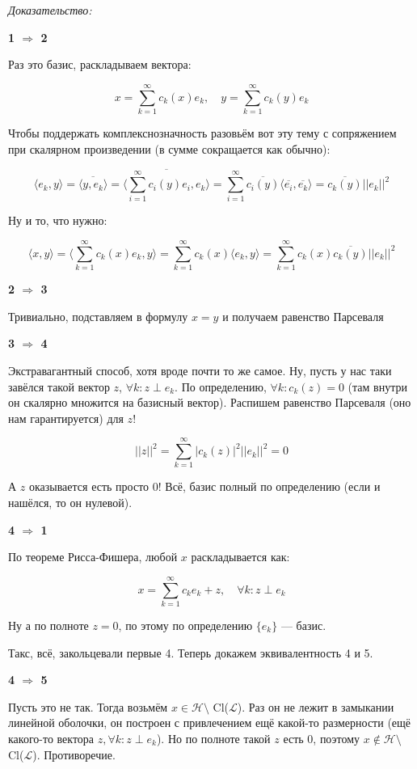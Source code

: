 \documentclass{article}
\def\sk#1#2{\langle #1, #2 \rangle}
\begin{document}
\textit{Доказательство:}

\textbf{1 $\Rightarrow$ 2}

Раз это базис, раскладываем вектора:

\[x = \sum_{k = 1}^{\infty} c_k(x)e_k, \quad y = \sum_{k = 1}^{\infty} c_k(y)e_k\]

Чтобы поддержать комплекснозначность разовьём вот эту тему с сопряжением при скалярном произведении (в сумме сокращается как обычно):

\[\sk{e_k}{y} = \overline{\sk{y}{e_k}} = \overline{\sk{\sum_{i = 1}^{\infty} c_i(y)e_i}{e_k}} = \sum_{i = 1}^{\infty}\overline{c_i(y)}\sk{\overline{e_i}}{\overline{e_k}} = \overline{c_k(y)}||e_k||^2\]

Ну и то, что нужно:

\[\sk{x}{y} = \sk{\sum_{k = 1}^{\infty} c_k(x)e_k}{y} = \sum_{k = 1}^{\infty} c_k(x)\sk{e_k}{y} = \sum_{k = 1}^{\infty} c_k(x) \overline{c_k(y)}||e_k||^2\]

\textbf{2 $\Rightarrow$ 3}

Тривиально, подставляем в формулу $x = y$ и получаем равенство Парсеваля

\textbf{3 $\Rightarrow$ 4}

Экстравагантный способ, хотя вроде почти то же самое. Ну, пусть у нас таки завёлся такой вектор $z$, $\forall k : z \perp e_k$. По определению, $\forall k: c_k(z) = 0$ (там внутри он скалярно множится на базисный вектор). Распишем равенство Парсеваля (оно нам гарантируется) для $z$!

\[||z||^2 = \sum_{k = 1}^{\infty} |c_k(z)|^2 ||e_k||^2 = 0\]

А $z$ оказывается есть просто 0! Всё, базис полный по определению (если и нашёлся, то он нулевой).

\textbf{4 $\Rightarrow$ 1}

По теореме Рисса-Фишера, любой $x$ раскладывается как:

\[x = \sum_{k = 1}^{\infty} c_k e_k + z, \quad \forall k: z \perp e_k\]

Ну а по полноте $z = 0$, по этому по определению $\{e_k\}$ --- базис.


Такс, всё, закольцевали первые 4. Теперь докажем эквивалентность 4 и 5.

\textbf{4 $\Rightarrow$ 5}

Пусть это не так. Тогда возьмём $x \in \mathcal{H} \setminus $ Cl($\mathcal{L}$). Раз он не лежит в замыкании линейной оболочки, он построен с привлечением ещё какой-то размерности (ещё какого-то вектора $z, \forall k : z \perp e_k$). Но по полноте такой $z$ есть 0, поэтому $x \notin \mathcal{H} \setminus $ Cl($\mathcal{L}$). Противоречие.
\end{document}
